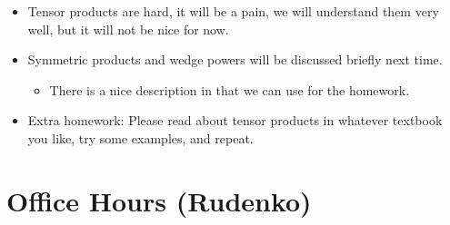 \documentclass[../notes.tex]{subfiles}
\begin{document}
\begin{itemize}
    \item Tensor products are hard, it will be a pain, we will understand them very well, but it will not be nice for now.
    \item Symmetric products and wedge powers will be discussed briefly next time.
    \begin{itemize}
        \item There is a nice description in \textcite{bib:Serre} that we can use for the homework.
    \end{itemize}
    \item Extra homework: Please read about tensor products in whatever textbook you like, try some examples, and repeat.
\end{itemize}



\section{Office Hours (Rudenko)}
\end{document}
